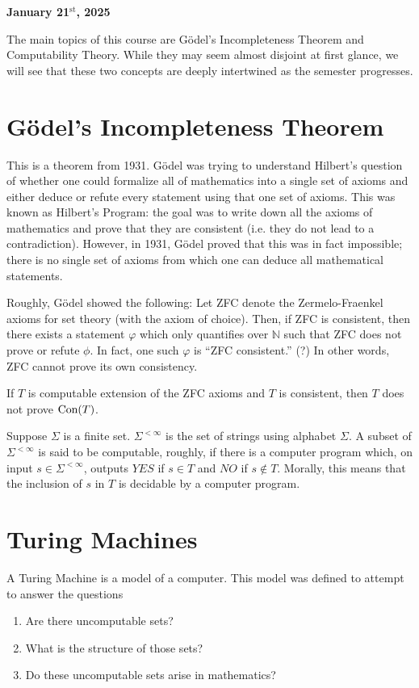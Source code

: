 
\textbf{January 21$^{\text{st}}$, 2025}

The main topics of this course are Gödel's Incompleteness Theorem and Computability Theory.
While they may seem almost disjoint at first glance, we will see that these two concepts are deeply intertwined as the semester progresses.
\section{Gödel's Incompleteness Theorem}
This is a theorem from 1931.
Gödel was trying to understand Hilbert's question of whether one could formalize all of mathematics into a single set of axioms and either deduce or refute every statement using that one set of axioms.
This was known as Hilbert's Program: the goal was to write down all the axioms of mathematics and prove that they are consistent (i.e. they do not lead to a contradiction).
However, in 1931, Gödel proved that this was in fact impossible;
there is no single set of axioms from which one can deduce all mathematical statements.

Roughly, Gödel showed the following:
Let ZFC denote the Zermelo-Fraenkel axioms for set theory (with the axiom of choice).
Then, if ZFC is consistent, then there exists a statement $\varphi$ which only quantifies over $\mathbb{N}$ such that ZFC does not prove or refute $\phi$.
In fact, one such $\varphi$ is ``ZFC consistent.'' (?)
In other words, ZFC cannot prove its own consistency.

If $T$ is computable extension of the ZFC axioms and $T$ is consistent, then $T$ does not prove $\text{Con}(T)$.

Suppose $\Sigma$ is a finite set.
$\Sigma^{< \infty}$ is the set of strings using alphabet $\Sigma$.
A subset of $\Sigma^{< \infty}$ is said to be computable, roughly, if
there is a computer program which, on input $s \in \Sigma^{< \infty}$, outputs $YES$ if $s \in T$ and $NO$ if $s \notin T$.
Morally, this means that the inclusion of $s$ in $T$ is decidable by a computer program.

\section{Turing Machines}
A Turing Machine is a model of a computer.
This model was defined to attempt to answer the questions
\begin{enumerate}
    \item Are there uncomputable sets?
    \item What is the structure of those sets?
    \item Do these uncomputable sets arise in mathematics?
\end{enumerate}

